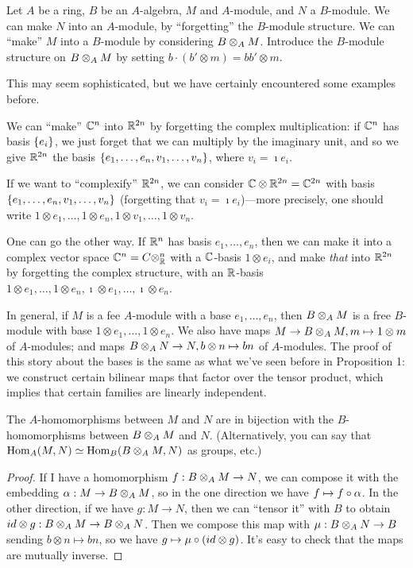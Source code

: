 \begin{dfn}
Let $A$ be a ring, $B$ be an $A$-algebra, $M$ and $A$-module, and $N$ a $B$-module. 
We can make $N$ into an $A$-module, by ``forgetting'' the $B$-module structure.
We can ``make'' $M$ into a $B$-module by considering $B \otimes_{A} M$.
Introduce the $B$-module structure on $B \otimes_{A} M$ by setting $b \cdot (b' \otimes m) = bb' \otimes m$.
\end{dfn}
This may seem sophisticated, but we have certainly encountered some examples before.
\begin{ex}
We can ``make'' $\mathbb{C}^n$ into $\mathbb{R}^{2n}$ by forgetting the complex multiplication: if $\mathbb{C}^n$ has basis $\left\{e_i\right\}$, we just forget that we can multiply by the imaginary unit, and so we give $\mathbb{R}^{2n}$ the basis $\left\{e_1, \dotsc, e_n, v_1, \dotsc, v_n\right\}$, where $v_i = \imath e_i$. 

If we want to ``complexify'' $\mathbb{R}^{2n}$, we can consider $\mathbb{C} \otimes \mathbb{R}^{2n} = \mathbb{C}^{2n}$ with basis $\left\{e_1, \dotsc, e_n, v_1, \dotsc, v_n\right\}$ (forgetting that $v_i = \imath e_i$)---more precisely, one should write $1 \otimes e_1, \dotsc, 1 \otimes e_n, 1 \otimes v_1, \dotsc, 1 \otimes v_n$.

One can go the other way. If $\mathbb{R}^n$ has basis $e_1, \dotsc, e_n$, then we can make it into a complex vector space $\mathbb{C}^n = C \otimes_{\mathbb{R}}^n$ with a $\mathbb{C}$-basis $1 \otimes e_i$, and make \emph{that} into $\mathbb{R}^{2n}$ by forgetting the complex structure, with an $\mathbb{R}$-basis $1 \otimes e_1, \dotsc, 1 \otimes e_n, \imath \otimes e_1, \dotsc, \imath \otimes e_n$.
\end{ex}

In general, if $M$ is a fee $A$-module with a base $e_1, \dotsc, e_n$, then $B \otimes_{A} M$ is a free $B$-module with base $1 \otimes e_1, \dotsc, 1 \otimes e_n$.
We also have maps $M \to B \otimes_{A} M, m \mapsto 1 \otimes m$ of $A$-modules; and maps $B \otimes_{A} N \to N, b \otimes n \mapsto bn$ of $A$-modules.
The proof of this story about the bases is the same as what we've seen before in Proposition 1: we construct certain bilinear maps that factor over the tensor product, which implies that certain families are linearly independent.

\begin{thm}
The $A$-homomorphisms between $M$ and $N$ are in bijection with the $B$-homomorphisms between $B \otimes_{A} M$ and $N$. 
(Alternatively, you can say that $\mathrm{Hom}_{A}({M, N}) \simeq \mathrm{Hom}_{B}({B \otimes_{A} M, N})$ as groups, etc.)
\end{thm}
\begin{proof}
If I have a homomorphism $f: B \otimes_{A} M \to N$, we can compose it with the embedding $\alpha: M \to B \otimes_{A} M$, so in the one direction we have $f \mapsto f \circ \alpha$. 
In the other direction, if we have $g: M \to N$, then we can ``tensor it'' with $B$ to obtain $id \otimes g: B \otimes_{A} M \to B \otimes_{A} N$.
Then we compose this map with $\mu: B \otimes_{A} N \to B$ sending $b \otimes n \mapsto bn$, so we have $g \mapsto \mu \circ (id \otimes g)$.
It's easy to check that the maps are mutually inverse.
\end{proof}

